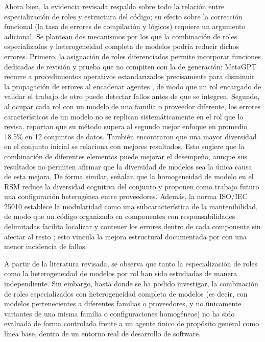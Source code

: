 Ahora bien, la evidencia revisada respalda sobre todo la relación entre especialización de roles y estructura del código; su efecto sobre la corrección funcional (la tasa de errores de compilación y lógicos) requiere un argumento adicional. Se plantean dos mecanismos por los que la combinación de roles especializados y heterogeneidad completa de modelos podría reducir dichos errores. Primero, la asignación de roles diferenciados permite incorporar funciones dedicadas de revisión y prueba que no compiten con la de generación: MetaGPT recurre a procedimientos operativos estandarizados precisamente para disminuir la propagación de errores al encadenar agentes \parencite{hong2024metagpt}, de modo que un rol encargado de validar el trabajo de otro puede detectar fallos antes de que se integren. Segundo, al ocupar cada rol con un modelo de una familia o proveedor diferente, los errores característicos de un modelo no se replican sistemáticamente en el rol que lo revisa. \textcite{feng2025heteroswarms} reportan que su método supera al segundo mejor enfoque en promedio 18.5\% en 12 conjuntos de datos. También encontraron que una mayor diversidad en el conjunto inicial se relaciona con mejores resultados. Esto sugiere que la combinación de diferentes elementos puede mejorar el desempeño, aunque sus resultados no permiten afirmar que la diversidad de modelos sea la única causa de esta mejora. De forma similar, \textcite{fernandezyfernandez2026rsm} señalan que la homogeneidad de modelo en el RSM reduce la diversidad cognitiva del conjunto y proponen como trabajo futuro una configuración heterogénea entre proveedores. Además, la norma ISO/IEC 25010 establece la modularidad como una subcaracterística de la mantenibilidad, de modo que un código organizado en componentes con responsabilidades delimitadas facilita localizar y contener los errores dentro de cada componente sin afectar al resto \parencite{iso25010}; esto vincula la mejora estructural documentada por \textcite{donato2026rolebased} con una menor incidencia de fallos.

A partir de la literatura revisada, se observa que tanto la especialización de roles como la heterogeneidad de modelos por rol han sido estudiadas de manera independiente. Sin embargo, hasta donde se ha podido investigar, la combinación de roles especializados con heterogeneidad completa de modelos (es decir, con modelos pertenecientes a diferentes familias o proveedores, y no únicamente variantes de una misma familia o configuraciones homogéneas) no ha sido evaluada de forma controlada frente a un agente único de propósito general como línea base, dentro de un entorno real de desarrollo de software.

